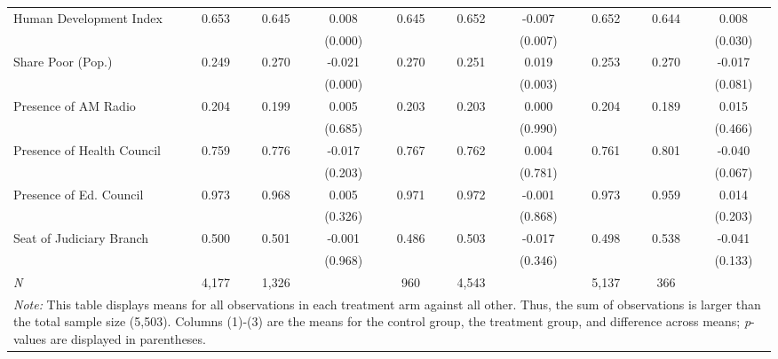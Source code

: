 \begin{table}[!htbp]
\begin{tabular}{@{\extracolsep{-4pt}}l@{\extracolsep{-3pt}}ccccccccc}
Human Development Index \vspace{1pt} & 0.653 & 0.645 & 0.008   & 0.645 & 0.652 & -0.007  & 0.652 & 0.644 & 0.008      \\
                                     &       &       & (0.000) &       &       & (0.007) &       &       & (0.030)    \\
Share Poor (Pop.)                    & 0.249 & 0.270 & -0.021  & 0.270 & 0.251 & 0.019   & 0.253 & 0.270 & -0.017     \\
                                     &       &       & (0.000) &       &       & (0.003) &       &       & (0.081)    \\
Presence of AM Radio                 & 0.204 & 0.199 & 0.005   & 0.203 & 0.203 & 0.000   & 0.204 & 0.189 & 0.015      \\
                                     &       &       & (0.685) &       &       & (0.990) &       &       & (0.466)    \\
Presence of Health Council           & 0.759 & 0.776 & -0.017  & 0.767 & 0.762 & 0.004   & 0.761 & 0.801 & -0.040     \\
                                     &       &       & (0.203) &       &       & (0.781) &       &       & (0.067)    \\
Presence of Ed. Council              & 0.973 & 0.968 & 0.005   & 0.971 & 0.972 & -0.001  & 0.973 & 0.959 & 0.014      \\
                                     &       &       & (0.326) &       &       & (0.868) &       &       & (0.203)    \\
Seat of Judiciary Branch             & 0.500 & 0.501 & -0.001  & 0.486 & 0.503 & -0.017  & 0.498 & 0.538 & -0.041     \\
                                     &       &       & (0.968) &       &       & (0.346) &       &       & (0.133) \B \\
\hline
\emph{N} & 4,177 & 1,326 & & 960 & 4,543 & & 5,137 & 366 & \T \B \\
\hline
\hline
\multicolumn{10}{p{.95\textwidth}}{\emph{Note:} This table displays means for all observations in each treatment arm against all other. Thus, the sum of observations is larger than the total sample size (5,503). Columns (1)-(3) are the means for the control group, the treatment group, and difference across means; \emph{p}-values are displayed in parentheses.}
\end{tabular}
\end{table}

